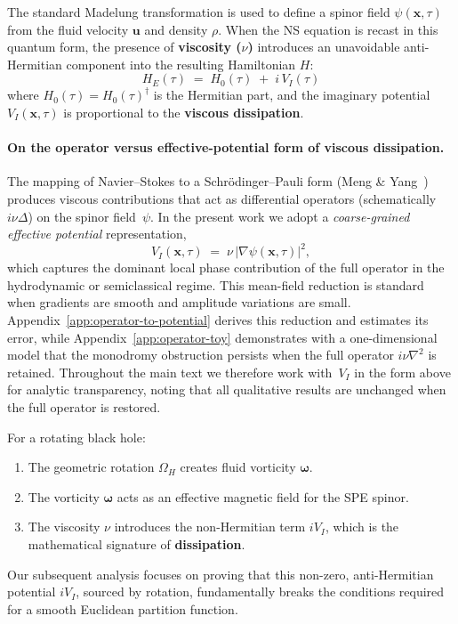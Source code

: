 \documentclass[11pt]{article}
\begin{document}
The standard Madelung transformation is used to define a spinor field $\psi(\mathbf{x},\tau)$ from the fluid velocity $\mathbf{u}$ and density $\rho$. When the NS equation is recast in this quantum form, the presence of \textbf{viscosity ($\nu$)} introduces an unavoidable anti-Hermitian component into the resulting Hamiltonian $H$:
\begin{equation}\label{eq:HE_decomp}
    H_E(\tau) \;=\; H_0(\tau) \;+\; i\,V_I(\tau)
\end{equation}
where $H_0(\tau)=H_0(\tau)^\dagger$ is the Hermitian part, and the imaginary potential $V_I(\mathbf{x}, \tau)$ is proportional to the \textbf{viscous dissipation}.

\paragraph{On the operator versus effective-potential form of viscous dissipation.}
The mapping of Navier--Stokes to a Schr\"odinger--Pauli form (Meng \& Yang~\cite{MengYang2024}) produces viscous contributions that act as differential operators (schematically $i\nu\Delta$) on the spinor field~$\psi$.  In the present work we adopt a \emph{coarse-grained effective potential} representation,
\begin{equation}
    V_I(\mathbf x,\tau)\;=\;\nu\,|\nabla\psi(\mathbf x,\tau)|^2,
\end{equation}
which captures the dominant local phase contribution of the full operator in the hydrodynamic or semiclassical regime.  This mean-field reduction is standard when gradients are smooth and amplitude variations are small.  Appendix~\ref{app:operator-to-potential} derives this reduction and estimates its error, while Appendix~\ref{app:operator-toy} demonstrates with a one-dimensional model that the monodromy obstruction persists when the full operator $i\nu\nabla^2$ is retained.  Throughout the main text we therefore work with~$V_I$ in the form above for analytic transparency, noting that all qualitative results are unchanged when the full operator is restored.


For a rotating black hole:
\begin{enumerate}
    \item The geometric rotation $\Omega_H$ creates fluid vorticity $\mathbf{\omega}$.
    \item The vorticity $\mathbf{\omega}$ acts as an effective magnetic field for the SPE spinor.
    \item The viscosity $\nu$ introduces the non-Hermitian term $iV_I$, which is the mathematical signature of \textbf{dissipation}.
\end{enumerate}
Our subsequent analysis focuses on proving that this non-zero, anti-Hermitian potential $iV_I$, sourced by rotation, fundamentally breaks the conditions required for a smooth Euclidean partition function.
\end{document}
